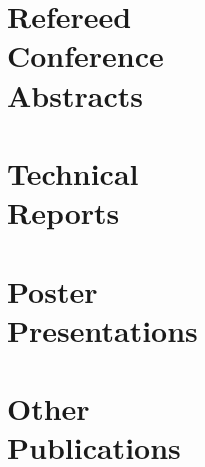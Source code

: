 \documentclass[margin,line]{resume}
\begin{document}
\begin{resume}
    \section{\mysidestyle Refereed\\Conference\\Abstracts}
    \begin{bibenum}
        \item {}
         \item {}
    \end{bibenum}

    \section{\mysidestyle Technical\\Reports}
    \begin{bibenum}
       \item {}
    \end{bibenum}
    \section{\mysidestyle Poster\\Presentations}
    \begin{bibenum}
        \item {}
        \item {}
    \end{bibenum}
    \section{\mysidestyle Other\\Publications}
    \begin{bibenum}
         \item {}
    \end{bibenum}

\end{resume}
\end{document}
